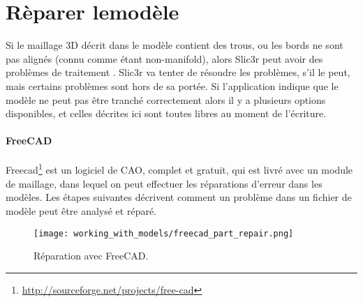 \section{R\`eparer lemod\`ele} %

Si le maillage 3D d\'ecrit dans le mod\`ele contient des trous, ou les bords ne sont pas align\'es (connu comme \'etant non-manifold), alors Slic3r peut avoir des probl\`emes de traitement . Slic3r va tenter de r\'esoudre les probl\`emes, s'il le peut, mais certains probl\`emes sont hors de sa port\'ee. Si l'application indique que le mod\`ele ne peut pas \^etre tranch\'e correctement alors il y a plusieurs options disponibles, et celles d\'ecrites ici sont toutes libres au moment de l'\'ecriture.

{}

\paragraph{FreeCAD} %
\label{par:freecad}

Freecad\footnote{\url{http://sourceforge.net/projects/free-cad}} est un logiciel de CAO, complet et gratuit, qui est livr\'e avec un module de maillage, dans lequel on peut effectuer les r\'eparations d'erreur dans les mod\`eles. Les \'etapes suivantes d\'ecrivent comment un probl\`eme dans un fichier de mod\`ele peut \^etre analys\'e et r\'epar\'e.

\begin{figure}[H]
\centering
\texttt{[image: working\_with\_models/freecad\_part\_repair.png]}
\caption{R\'eparation avec FreeCAD.}
\label{fig:freecad_part_repair}
\end{figure}

